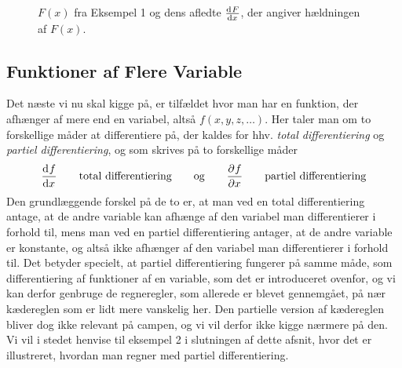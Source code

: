 \begin{figure}[h!]
	\centering
	\caption{$F(x)$ fra Eksempel 1 og dens afledte $\dif{x}{F}$, der
		angiver hældningen af $F(x)$.}
	\label{fig:eks1}
\end{figure}

\subsection{Funktioner af Flere Variable}
Det næste vi nu skal kigge på, er tilfældet hvor man har en funktion, der afhænger af mere end en variabel, altså $f(x,y,z,\ldots)$. Her taler man om to forskellige måder at differentiere på, der kaldes for hhv. \emph{total differentiering} og \emph{partiel differentiering}, og som skrives på to forskellige måder
\begin{align*}
\dif{x}{f} \qquad \text{total differentiering} \qquad \text{og} \qquad \pdif{x}{f} \qquad \text{partiel differentiering}
\end{align*} 
Den grundlæggende forskel på de to er, at man ved en total differentiering antage, at de andre variable kan afhænge af den variabel man differentierer i forhold til, mens man ved en partiel differentiering antager, at de andre variable er konstante, og altså ikke afhænger af den variabel man differentierer i forhold til. Det betyder specielt, at partiel differentiering fungerer på samme måde, som differentiering af funktioner af en variable, som det er introduceret ovenfor, og vi kan derfor genbruge de regneregler, som allerede er blevet gennemgået, på nær kædereglen som er lidt mere vanskelig her. Den partielle version af kædereglen bliver dog ikke relevant på campen, og vi vil derfor ikke kigge nærmere på den. Vi vil i stedet henvise til eksempel 2 i slutningen af dette afsnit, hvor det er illustreret, hvordan man regner med partiel differentiering.\\

